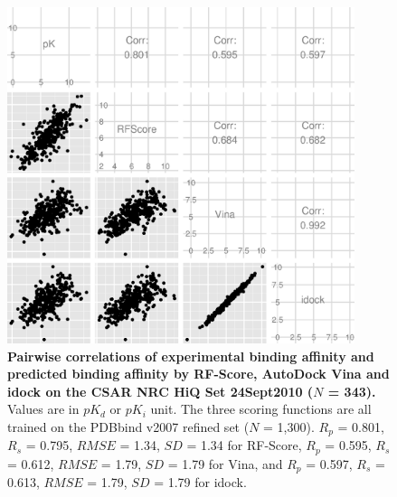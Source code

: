 \documentclass[10pt]{article}
\begin{document}
\begin{figure}[!ht]
\begin{center}
\includegraphics[width=4in]{../istar/CSAR2010Correlations.eps}
\end{center}
\caption{
{\bf Pairwise correlations of experimental binding affinity and predicted binding affinity by RF-Score, AutoDock Vina and idock on the CSAR NRC HiQ Set 24Sept2010 ($N$ = 343).} Values are in $pK_d$ or $pK_i$ unit. The three scoring functions are all trained on the PDBbind v2007 refined set ($N$ = 1,300). $R_p$ = 0.801, $R_s$ = 0.795, $RMSE$ = 1.34, $SD$ = 1.34 for RF-Score, $R_p$ = 0.595, $R_s$ = 0.612, $RMSE$ = 1.79, $SD$ = 1.79 for Vina, and $R_p$ = 0.597, $R_s$ = 0.613, $RMSE$ = 1.79, $SD$ = 1.79 for idock.
}
\label{CSAR2010Correlations}
\end{figure}

\end{document}
